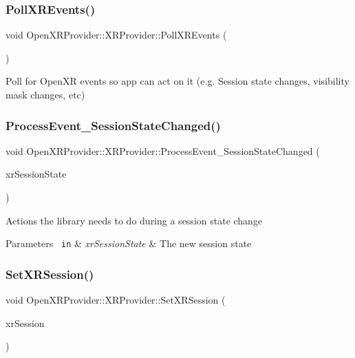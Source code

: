 \subsubsection{\texorpdfstring{PollXREvents()}{PollXREvents()}}
{\footnotesize\ttfamily void Open\+X\+R\+Provider\+::\+X\+R\+Provider\+::\+Poll\+X\+R\+Events (\begin{DoxyParamCaption}{ }\end{DoxyParamCaption})}



Poll for Open\+XR events so app can act on it (e.\+g. Session state changes, visibility mask changes, etc) 

\mbox{\label{class_open_x_r_provider_1_1_x_r_provider_ad8bb9f4fcd7a16440f89d3ad0b54b17b}} 
\subsubsection{\texorpdfstring{ProcessEvent\_SessionStateChanged()}{ProcessEvent\_SessionStateChanged()}}
{\footnotesize\ttfamily void Open\+X\+R\+Provider\+::\+X\+R\+Provider\+::\+Process\+Event\+\_\+\+Session\+State\+Changed (\begin{DoxyParamCaption}\item[{const Xr\+Session\+State}]{xr\+Session\+State }\end{DoxyParamCaption})\hspace{0.3cm}{\ttfamily [private]}}

Actions the library needs to do during a session state change 
\begin{DoxyParams}[1]{Parameters}
\mbox{\texttt{ in}}  & {\em xr\+Session\+State} & The new session state \\
\hline
\end{DoxyParams}
\mbox{\label{class_open_x_r_provider_1_1_x_r_provider_a96ffa9e4f37cc4967cf41fce027e5234}} 
\subsubsection{\texorpdfstring{SetXRSession()}{SetXRSession()}}
{\footnotesize\ttfamily void Open\+X\+R\+Provider\+::\+X\+R\+Provider\+::\+Set\+X\+R\+Session (\begin{DoxyParamCaption}\item[{Xr\+Session}]{xr\+Session }\end{DoxyParamCaption})\hspace{0.3cm}{\ttfamily [inline]}}

